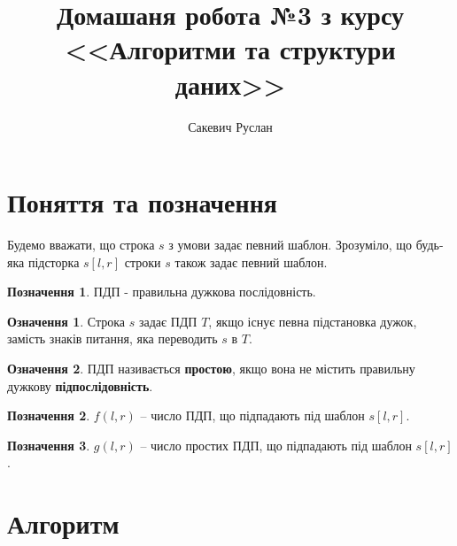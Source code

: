 \documentclass[
  11pt,
  a4paper
]{extarticle}
\title{Домашаня робота №3 з курсу \\ <<Алгоритми та структури даних>>}
\author{Сакевич Руслан}
\theoremstyle{definition}
\newtheorem{definition}{Означення}
\newtheorem{denotation}{Позначення}
\theoremstyle{remark}
\begin{document}
\maketitle

\section{Поняття та позначення}
  
  Будемо вважати, що строка $s$ з умови задає певний шаблон. Зрозуміло, що будь-яка підсторка $s[l, r]$ строки $s$ також задає певний шаблон.
  \begin{denotation}
    ПДП - правильна дужкова послідовність.
  \end{denotation}
  \begin{definition}
    Строка $s$ задає ПДП $T$, якщо існує певна підстановка дужок, замість знаків питання, яка переводить $s$ в $T$.
  \end{definition}
  \begin{definition}
    ПДП називається \textbf{простою}, якщо вона не містить правильну дужкову \textbf{підпослідовність}.
  \end{definition}
  \begin{denotation}
    $f(l, r)$ -- число ПДП, що підпадають під шаблон $s[l, r]$.
  \end{denotation}
  \begin{denotation}
    $g(l, r)$ -- число простих ПДП, що підпадають під шаблон $s[l, r]$.
  \end{denotation}
\section{Алгоритм}
\end{document}
